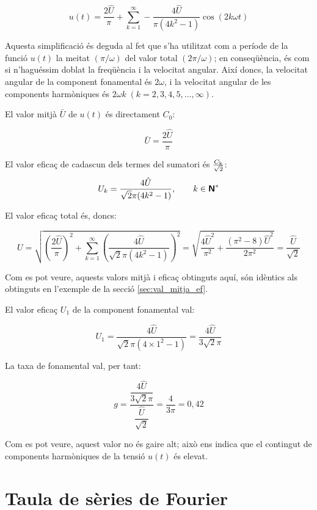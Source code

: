 \begin{exemple}[\ValorMitjaEfTaxaFon{}]
    \[
		u(t) = \frac{2\hat{U}}{\pi} + \sum_{k=1}^\infty - \frac{4\hat{U}}{\pi(4k^2-1)} \cos(2 k \omega t)
    \]

    Aquesta simplificació és deguda al fet que s'ha utilitzat com a
    període de la funció $u(t)$ la meitat $(\pi/\omega)$ del valor total
    $(2\pi/\omega)$; en conseqüència, és com si n'haguéssim doblat la
    freqüència i la velocitat angular. Així doncs, la velocitat angular
    de la component fonamental és $2\omega$, i la velocitat angular de
    les components harmòniques és $2\omega k \;(k=2,3,4,5,\ldots,\infty)$.

    El valor mitjà $\bar{U}$ de $u(t)$ és directament $C_0$:

    \[
        \bar{U} = \frac{2\hat{U}}{\pi}
    \]

    El valor eficaç de cadascun dels termes del sumatori és $\frac{C_\mathrm{k}}{\sqrt{2}}$:
    \[
        U_k =  \frac{4\hat{U}}{\sqrt{2}\pi(4k^2-1)},
        \qquad k \in {\ensuremath{\boldsymbol{\mathsf{N}}}}^*
    \]

    El valor eficaç total és, doncs:

    \[
        U=\sqrt{\left(\frac{2\hat{U}}{\pi}\right)^2 + \sum_{k=1}^\infty
        \left( \frac{4\hat{U}}{\sqrt{2}\pi(4k^2-1)}\right)^2} =
        \sqrt{\frac{4\hat{U}^2}{\pi^2} + \frac{(\pi^2-8)\hat{U}^2}{2\pi^2}
        }= \frac{\hat{U}}{\sqrt{2}}
    \]

    Com es pot veure, aquests valors mitjà i eficaç obtinguts aquí, són
    idèntics als obtinguts en l'exemple de la secció
    \ref{sec:val_mitja_ef}.

    El valor eficaç $U_1$ de la component fonamental val:

    \[
        U_1 =\frac{4\hat{U}}{\sqrt{2}\pi(4\times 1^2-1)} =
        \frac{4\hat{U}}{3\sqrt{2}\pi}
    \]

    La taxa de fonamental val, per tant:

    \[
        g =
        \frac{\dfrac{4\hat{U}}{3\sqrt{2}\pi}}{\dfrac{\hat{U}}{\sqrt{2}}}
        =\frac{4}{3\pi} = 0,{42}
    \]

    Com es pot veure, aquest valor no és gaire alt; això ens indica que
    el contingut de components harmòniques de la tensió $u(t)$ és
    elevat.
\end{exemple}


\section{Taula de sèries de Fourier}

